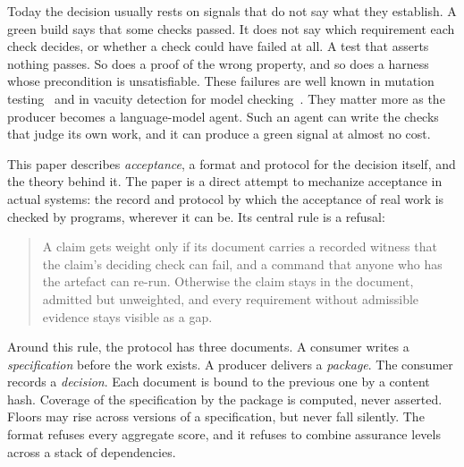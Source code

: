 \documentclass[11pt]{article}
\theoremstyle{definition}
\theoremstyle{remark}
\begin{document}
Today the decision usually rests on signals that do not say what they establish. A green build says
that some checks passed. It does not say which requirement each check decides, or whether a check
could have failed at all. A test that asserts nothing passes. So does a proof of the wrong property,
and so does a harness whose precondition is unsatisfiable. These failures are well known in mutation
testing~\cite{demillo1978} and in vacuity detection for model checking~\cite{beer2001,kupferman1999}.
They matter more as the producer becomes a language-model agent. Such an agent can write the checks
that judge its own work, and it can produce a green signal at almost no cost.

This paper describes \emph{acceptance}, a format and protocol for the decision itself, and the
theory behind it. The paper is a direct attempt to mechanize acceptance in actual systems: the
record and protocol by which the acceptance of real work is checked by programs, wherever it can
be. Its central rule is a refusal:

\begin{quote}
A claim gets weight only if its document carries a recorded witness that the claim's deciding check
can fail, and a command that anyone who has the artefact can re-run. Otherwise the claim stays in the
document, admitted but unweighted, and every requirement without admissible evidence stays visible as
a gap.
\end{quote}

Around this rule, the protocol has three documents. A consumer writes a \emph{specification} before
the work exists. A producer delivers a \emph{package}. The consumer records a \emph{decision}. Each
document is bound to the previous one by a content hash. Coverage of the specification by the
package is computed, never asserted. Floors may rise across versions of a specification, but never
fall silently. The format refuses every aggregate score, and it refuses to combine assurance levels
across a stack of dependencies.
\end{document}
